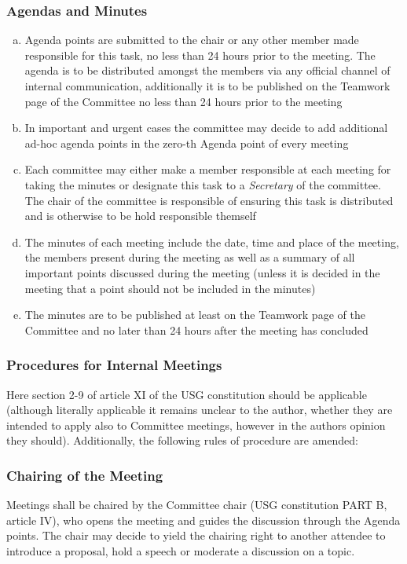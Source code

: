 \subsubsection[Agendas and Minutes]{Agendas and Minutes}\label{provision:agendas minutes}
\begin{enumerate}[a)]
	\item Agenda points are submitted to the chair or any other member made responsible for this task, no less than 24 hours prior to the meeting. The agenda is to be distributed amongst the members via any official channel of internal communication, additionally it is to be published on the Teamwork page of the Committee no less than 24 hours prior to the meeting 
	\item In important and urgent cases the committee may decide to add additional ad-hoc agenda points in the zero-th Agenda point of every meeting
	\item Each committee may either make a member responsible at each meeting for taking the minutes or designate this task to a \emph{Secretary} of the committee. The chair of the committee is responsible of ensuring this task is distributed and is otherwise to be hold responsible themself
	\item The minutes of each meeting include the date, time and place of the meeting, the members present during the meeting as well as a summary of all important points discussed during the meeting (unless it is decided in the meeting that a point should not be included in the minutes)
	\item The minutes are to be published at least on the Teamwork page of the Committee and no later than 24 hours after the meeting has concluded
\end{enumerate}
\subsubsection[Meeting Procedures]{Procedures for Internal Meetings}
Here section 2-9 of article XI of the USG constitution should be applicable (although literally applicable it remains unclear to the author, whether they are intended to apply also to Committee meetings, however in the authors opinion they should). Additionally, the following rules of procedure are amended:
\subsubsection{Chairing of the Meeting}
Meetings shall be chaired by the Committee chair (USG constitution PART B, article IV), who opens the meeting and guides the discussion through the Agenda points. The chair may decide to yield the chairing right to another attendee to introduce a proposal, hold a speech or moderate a discussion on a topic.
